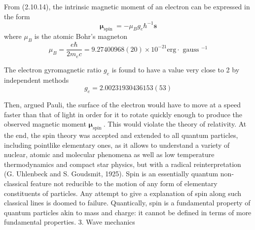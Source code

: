 \documentclass{article}
\begin{document}
From (2.10.14), the intrinsic magnetic moment of an electron can be expressed in the form
$$
\begin{equation*}
\boldsymbol{\mu}_{\text {spin }}=-\mu_{B} g_{e} \hbar^{-1} \boldsymbol{s} \tag{2.10.23}
\end{equation*}
$$
where $\mu_{B}$ is the atomic Bohr's magneton
$$
\begin{equation*}
\mu_{B}=\frac{e \hbar}{2 m_{e} c}=9.27400968(20) \times 10^{-21} \mathrm{erg} \cdot \text { gauss }^{-1} \tag{2.10.24}
\end{equation*}
$$

The electron gyromagnetic ratio $g_{e}$ is found to have a value very close to 2 by independent methods
$$
\begin{equation*}
g_{e}=2.00231930436153(53) \tag{2.10.25}
\end{equation*}
$$

Then, argued Pauli, the surface of the electron would have to move at a speed faster than that of light in order for it to rotate quickly enough to produce the observed magnetic moment $\boldsymbol{\mu}_{\text {spin }}$. This would violate the theory of relativity. At the end, the spin theory was accepted and extended to all quantum particles, including pointlike elementary ones, as it allows to understand a variety of nuclear, atomic and molecular phenomena as well as low temperature thermodynamics and compact star physics, but with a radical reinterpretation (G. Uhlenbeck and S. Goudsmit, 1925). Spin is an essentially quantum non-classical feature not reducible to the motion of any form of elementary constituents of particles. Any attempt to give a explanation of spin along such classical lines is doomed to failure. Quantically,
spin is a fundamental property of quantum particles akin to mass and charge: it cannot be defined in terms of more fundamental properties.
3. Wave mechanics
\end{document}
